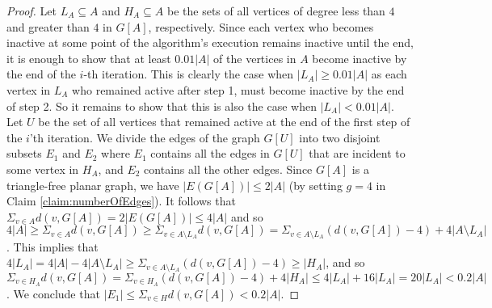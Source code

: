 \documentclass{article}
\theoremstyle{definition}
\begin{document}
\begin{proof} Let $L_A \subseteq A$ and $H_A \subseteq A$ be the sets of all vertices of degree less than $4$ and greater than $4$ in $G[A]$, respectively. Since each vertex who becomes inactive at some point of the algorithm's execution remains inactive until the end, it is enough to show that at least $0.01|A|$ of the vertices in $A$ become inactive by the end of the $i$-th iteration. This is clearly the case when $|L_A| \ge 0.01|A|$ as each vertex in $L_A$ who remained active after step 1, must become inactive by the end of step 2. %
So it remains to show that this is also the case when $|L_A| < 0.01|A|$. Let $U$ be the set of all vertices that remained active at the end of the first step of the $i$'th iteration. We divide the edges of the graph $G[U]$ into two disjoint subsets $E_{1}$ and $E_{2}$ where $E_{1}$ contains all the edges in $G[U]$ that are incident to some vertex in $H_A$, and $E_{2}$ contains all the other edges. Since $G[A]$ is a triangle-free planar graph, we have %
$|E(G[A])| \le 2|A|$ (by setting $g = 4$ in Claim \ref{claim:numberOfEdges}). It follows that $\Sigma_{v \in A}d(v, G[A]) = 2|E(G[A])| \le 4|A|$ and so $4|A| \ge \Sigma_{v \in A}d(v, G[A]) \ge \Sigma_{v \in A \setminus L_A} d(v, G[A]) = \Sigma_{v \in A \setminus L_A} (d(v, G[A]) - 4) + 4|A \setminus L_A|$. This implies that $4|L_A| = 4|A| - 4|A \setminus L_A| \ge \Sigma_{v \in A \setminus L_A} (d(v, G[A]) - 4) \ge |H_A|$, and so $\Sigma_{v \in H_A}d(v, G[A]) = \Sigma_{v \in H_A}(d(v, G[A]) - 4) + 4|H_A| \le 4|L_A| + 16|L_A| = 20|L_A| < 0.2|A|$. We conclude that $|E_{1}| \le \Sigma_{v \in H}d(v, G[A]) < 0.2|A|$.


\end{proof}
\end{document}
